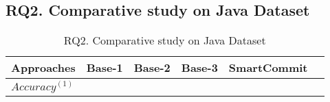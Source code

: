 \subsection{RQ2. Comparative study on Java Dataset}

\begin{table}[t]
	\caption{RQ2. Comparative study on Java Dataset}
	\vspace{-0.1in}
	\begin{center}
		\footnotesize
		\tabcolsep 4pt
		\renewcommand{\arraystretch}{1} \begin{tabular}{p{1.4cm}<{\centering}|p{0.7cm}<{\centering}p{0.7cm}<{\centering}p{0.7cm}<{\centering}p{1.5cm}<{\centering}|p{0.7cm}<{\centering}}
			
			\hline
			Approaches          & Base-1 & Base-2 & Base-3 & SmartCommit & \tool\\
			\hline
			$Accuracy^{(1)}$   &                &			 	&				   &		&      \\
			\hline
		\end{tabular}
		\label{RQ2-result}
	\end{center}
\end{table}


